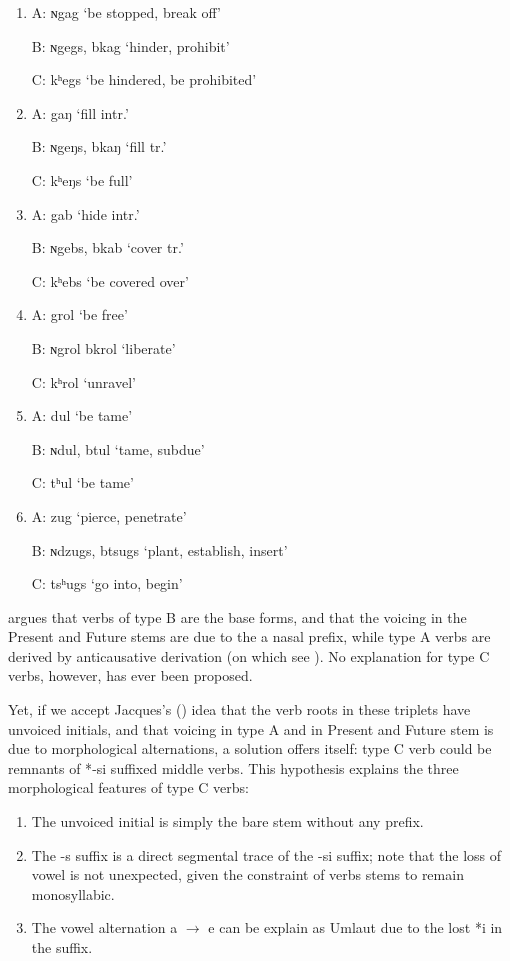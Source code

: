 \documentclass[oldfontcommands,oneside,a4paper,11pt]{article}
\newcommand{\ipa}[1]{{\phon \mbox{#1}}} %
\begin{document}
\begin{enumerate}
\item 
A: ɴgag ‘be stopped, break off’

B: ɴgegs, bkag ‘hinder, prohibit’

C: kʰegs ‘be hindered, be prohibited’

\item 
A: gaŋ ‘fill intr.’

B: ɴgeŋs, bkaŋ ‘fill tr.’

C: kʰeŋs ‘be full’

\item 
A: gab ‘hide intr.’

B: ɴgebs, bkab ‘cover tr.’

C: kʰebs ‘be covered over’

\item 
A: grol ‘be free’

B: ɴgrol  bkrol ‘liberate’

C: kʰrol ‘unravel’

\item 
A: dul ‘be tame’

B: ɴdul, btul ‘tame, subdue’

C: tʰul ‘be tame’

\item 
A: zug ‘pierce, penetrate’

B: ɴdzugs, btsugs ‘plant, establish, insert’

C: tsʰugs ‘go into, begin’
\end{enumerate}
\citet{jacques12internal} argues that verbs of type B are the base forms, and that the voicing in the Present and Future stems are due to the a nasal prefix, while type A verbs are derived by anticausative derivation (on which see \citealt{jacques15spontaneous, jacques15causative}). No explanation for type C verbs, however, has ever been proposed.  

Yet, if we accept Jacques's (\citeyear{jacques12internal}) idea that the verb roots in these triplets have unvoiced initials, and that voicing in type A and in Present and Future stem is due to morphological alternations, a solution offers itself: type C verb could be remnants of *\ipa{-si} suffixed middle verbs. This hypothesis explains the three morphological features of type C verbs:

\begin{enumerate}
\item The unvoiced initial is simply the bare stem without any prefix.
\item The \ipa{-s} suffix is a direct segmental trace of the \ipa{-si} suffix; note that the loss of vowel is not unexpected, given the constraint of verbs stems to remain monosyllabic.
\item The vowel alternation \ipa{a} $\rightarrow$ \ipa{e} can be explain as Umlaut due to the lost *\ipa{i} in the suffix. 
\end{enumerate}
\end{document}
